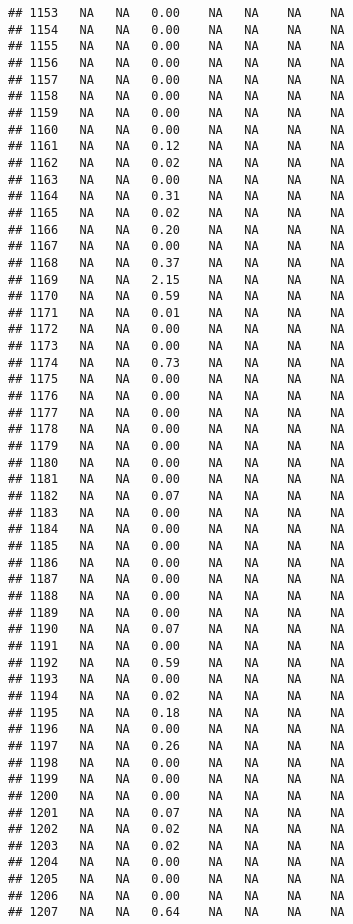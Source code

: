 \documentclass{article}\usepackage{graphicx, color}
\makeatletter
\newenvironment{kframe}{%
 \def\at@end@of@kframe{}%
 \ifinner\ifhmode%
  \def\at@end@of@kframe{\end{minipage}}%
  \begin{minipage}{\columnwidth}%
 \fi\fi%
 \def\FrameCommand##1{\hskip\@totalleftmargin \hskip-\fboxsep
 \colorbox{shadecolor}{##1}\hskip-\fboxsep
     \hskip-\linewidth \hskip-\@totalleftmargin \hskip\columnwidth}%
 \MakeFramed {\advance\hsize-\width
   \@totalleftmargin\z@ \linewidth\hsize
   \@setminipage}}%
 {\par\unskip\endMakeFramed%
 \at@end@of@kframe}
\newenvironment{knitrout}{}{} %
\makeatother
\begin{document}
\begin{knitrout}
\begin{kframe}
\begin{verbatim}
## 1153   NA   NA   0.00    NA   NA    NA    NA
## 1154   NA   NA   0.00    NA   NA    NA    NA
## 1155   NA   NA   0.00    NA   NA    NA    NA
## 1156   NA   NA   0.00    NA   NA    NA    NA
## 1157   NA   NA   0.00    NA   NA    NA    NA
## 1158   NA   NA   0.00    NA   NA    NA    NA
## 1159   NA   NA   0.00    NA   NA    NA    NA
## 1160   NA   NA   0.00    NA   NA    NA    NA
## 1161   NA   NA   0.12    NA   NA    NA    NA
## 1162   NA   NA   0.02    NA   NA    NA    NA
## 1163   NA   NA   0.00    NA   NA    NA    NA
## 1164   NA   NA   0.31    NA   NA    NA    NA
## 1165   NA   NA   0.02    NA   NA    NA    NA
## 1166   NA   NA   0.20    NA   NA    NA    NA
## 1167   NA   NA   0.00    NA   NA    NA    NA
## 1168   NA   NA   0.37    NA   NA    NA    NA
## 1169   NA   NA   2.15    NA   NA    NA    NA
## 1170   NA   NA   0.59    NA   NA    NA    NA
## 1171   NA   NA   0.01    NA   NA    NA    NA
## 1172   NA   NA   0.00    NA   NA    NA    NA
## 1173   NA   NA   0.00    NA   NA    NA    NA
## 1174   NA   NA   0.73    NA   NA    NA    NA
## 1175   NA   NA   0.00    NA   NA    NA    NA
## 1176   NA   NA   0.00    NA   NA    NA    NA
## 1177   NA   NA   0.00    NA   NA    NA    NA
## 1178   NA   NA   0.00    NA   NA    NA    NA
## 1179   NA   NA   0.00    NA   NA    NA    NA
## 1180   NA   NA   0.00    NA   NA    NA    NA
## 1181   NA   NA   0.00    NA   NA    NA    NA
## 1182   NA   NA   0.07    NA   NA    NA    NA
## 1183   NA   NA   0.00    NA   NA    NA    NA
## 1184   NA   NA   0.00    NA   NA    NA    NA
## 1185   NA   NA   0.00    NA   NA    NA    NA
## 1186   NA   NA   0.00    NA   NA    NA    NA
## 1187   NA   NA   0.00    NA   NA    NA    NA
## 1188   NA   NA   0.00    NA   NA    NA    NA
## 1189   NA   NA   0.00    NA   NA    NA    NA
## 1190   NA   NA   0.07    NA   NA    NA    NA
## 1191   NA   NA   0.00    NA   NA    NA    NA
## 1192   NA   NA   0.59    NA   NA    NA    NA
## 1193   NA   NA   0.00    NA   NA    NA    NA
## 1194   NA   NA   0.02    NA   NA    NA    NA
## 1195   NA   NA   0.18    NA   NA    NA    NA
## 1196   NA   NA   0.00    NA   NA    NA    NA
## 1197   NA   NA   0.26    NA   NA    NA    NA
## 1198   NA   NA   0.00    NA   NA    NA    NA
## 1199   NA   NA   0.00    NA   NA    NA    NA
## 1200   NA   NA   0.00    NA   NA    NA    NA
## 1201   NA   NA   0.07    NA   NA    NA    NA
## 1202   NA   NA   0.02    NA   NA    NA    NA
## 1203   NA   NA   0.02    NA   NA    NA    NA
## 1204   NA   NA   0.00    NA   NA    NA    NA
## 1205   NA   NA   0.00    NA   NA    NA    NA
## 1206   NA   NA   0.00    NA   NA    NA    NA
## 1207   NA   NA   0.64    NA   NA    NA    NA

\end{verbatim}
\end{kframe}
\end{knitrout}
\end{document}
